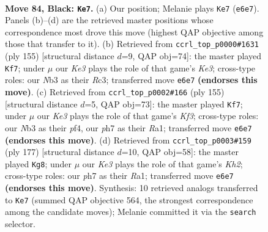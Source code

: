 \documentclass[11pt]{article}
\begin{document}
\clearpage

\begin{figure}[p]\centering
\begin{subfigure}{0.46\textwidth}\centering
\resizebox{\linewidth}{!}{%
\newchessgame
\chessboard[
  setfen={8/7P/R3k1p1/5p2/5P2/1n3K2/8/8 b - - 2 84},
  showmover=false,
  pgfstyle=straightmove, color=movearrow, markmove={e6-e7}
]}
\caption{}
\end{subfigure}\hfill
\begin{subfigure}{0.46\textwidth}\centering
\resizebox{\linewidth}{!}{%
\newchessgame
\chessboard[
  setfen={8/8/R3k1p1/5pP1/5P2/2r5/5K2/8 b - - 37 78},
  showmover=false,
  pgfstyle=straightmove, color=movearrow, markmove={e6-f7}
]}
\caption{}
\end{subfigure}
\\[4pt]
\begin{subfigure}{0.46\textwidth}\centering
\resizebox{\linewidth}{!}{%
\newchessgame
\chessboard[
  setfen={8/8/1R3kp1/7p/5P2/6PK/8/r7 b - - 5 78},
  showmover=false,
  pgfstyle=straightmove, color=movearrow, markmove={f6-f7}
]}
\caption{}
\end{subfigure}\hfill
\begin{subfigure}{0.46\textwidth}\centering
\resizebox{\linewidth}{!}{%
\newchessgame
\chessboard[
  setfen={8/4R2k/6p1/6P1/5K1P/8/8/r7 b - - 68 89},
  showmover=false,
  pgfstyle=straightmove, color=movearrow, markmove={h7-g8}
]}
\caption{}
\end{subfigure}
\caption{\textbf{Move 84, Black: \texttt{Ke7}.} (a) Our position; Melanie plays \texttt{Ke7} (\texttt{e6e7}). Panels (b)--(d) are the retrieved master positions whose correspondence most drove this move (highest QAP objective among those that transfer to it). (b) Retrieved from \texttt{ccrl\_top\_p0000\#1631} (ply 155) [structural distance $d$=9, QAP obj=74]: the master played \texttt{Kf7}; under $\mu$ our \emph{Ke3} plays the role of that game's \emph{Ke3}; cross-type roles: our \emph{N}b3 as their \emph{R}c3; transferred move \texttt{e6e7} \textbf{(endorses this move)}. (c) Retrieved from \texttt{ccrl\_top\_p0002\#166} (ply 155) [structural distance $d$=5, QAP obj=73]: the master played \texttt{Kf7}; under $\mu$ our \emph{Ke3} plays the role of that game's \emph{Kf3}; cross-type roles: our \emph{N}b3 as their \emph{p}f4, our \emph{p}h7 as their \emph{R}a1; transferred move \texttt{e6e7} \textbf{(endorses this move)}. (d) Retrieved from \texttt{ccrl\_top\_p0003\#159} (ply 177) [structural distance $d$=10, QAP obj=58]: the master played \texttt{Kg8}; under $\mu$ our \emph{Ke3} plays the role of that game's \emph{Kh2}; cross-type roles: our \emph{p}h7 as their \emph{R}a1; transferred move \texttt{e6e7} \textbf{(endorses this move)}. Synthesis: 10 retrieved analogs transferred to \texttt{Ke7} (summed QAP objective 564, the strongest correspondence among the candidate moves); Melanie committed it via the \texttt{search} selector.}
\label{fig:thought-m167}
\end{figure}
\end{document}
